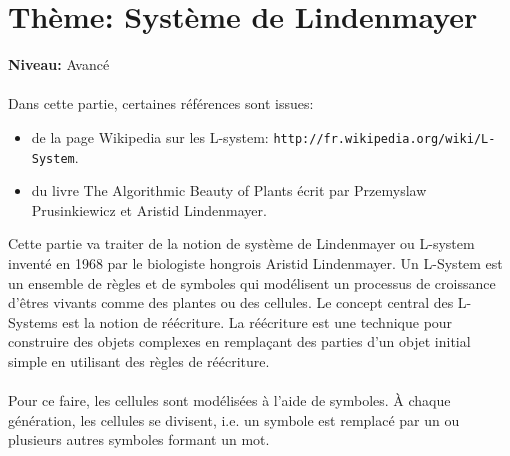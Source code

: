 \chapter{Thème: Système de Lindenmayer}
{ }\hfill\textbf{Niveau:} Avancé\\ \\
\noindent
Dans cette partie, certaines références sont issues:
\begin{itemize}
 \item  de la page Wikipedia sur les L-system: \texttt{http://fr.wikipedia.org/wiki/L-System}.
 \item du livre \og The Algorithmic Beauty of Plants \fg écrit par Przemyslaw Prusinkiewicz et Aristid Lindenmayer.
\end{itemize}
\vspace*{0.5cm}
Cette partie va traiter de la notion de  système de Lindenmayer ou L-system inventé en 1968 par le biologiste hongrois Aristid Lindenmayer. Un L-System est un ensemble de règles et de symboles qui modélisent un processus de croissance d'êtres vivants comme des plantes ou des cellules. Le concept central des L-Systems est la notion de réécriture. La réécriture est une technique pour construire des objets complexes en remplaçant des parties d'un objet initial simple en utilisant des règles de réécriture.\\ \\
Pour ce faire, les cellules sont modélisées à l'aide de symboles. À chaque génération, les cellules se divisent, i.e. un symbole est remplacé par un ou plusieurs autres symboles formant un mot.

